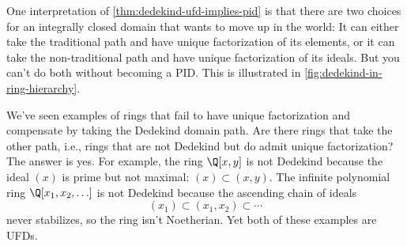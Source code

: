 One interpretation of \autoref{thm:dedekind-ufd-implies-pid} is that there are two choices for an integrally closed domain that wants to move up in the world: It can either take the traditional path and have unique factorization of its elements, or it can take the non-traditional path and have unique factorization of its ideals. But you can't do both without becoming a PID. This is illustrated in \autoref{fig:dedekind-in-ring-hierarchy}.

We've seen examples of rings that fail to have unique factorization and compensate by taking the Dedekind domain path. Are there rings that take the other path, i.e., rings that are not Dedekind but do admit unique factorization? The answer is yes. For example, the ring $\Q[x, y]$ is not Dedekind because the ideal $(x)$ is prime but not maximal: $(x) \subset (x, y)$. The infinite polynomial ring $\Q[x_1, x_2, \ldots]$ is not Dedekind because the ascending chain of ideals
\begin{equation}
    (x_1) \subset (x_1, x_2) \subset \cdots
\end{equation}
never stabilizes, so the ring isn't Noetherian. Yet both of these examples are UFDs.

